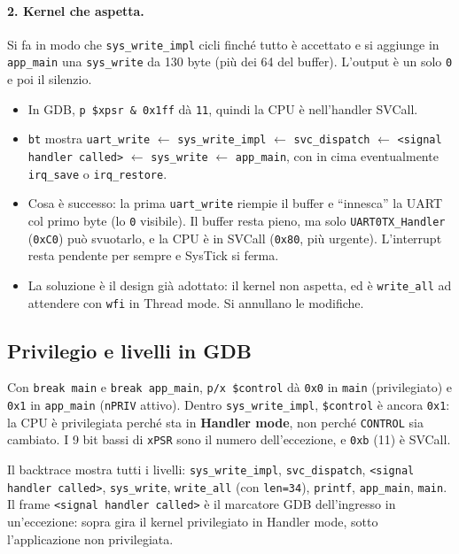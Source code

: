 \paragraph*{2. Kernel che aspetta.} Si fa in modo che \texttt{sys\_write\_impl} cicli finché tutto è accettato e si aggiunge in \texttt{app\_main} una \texttt{sys\_write} da 130 byte (più dei 64 del buffer). L'output è un solo \texttt{0} e poi il silenzio.
\begin{itemize}
    \item In GDB, \texttt{p \$xpsr \& 0x1ff} dà \texttt{11}, quindi la CPU è nell'handler SVCall.
    \item \texttt{bt} mostra \texttt{uart\_write} $\leftarrow$ \texttt{sys\_write\_impl} $\leftarrow$ \texttt{svc\_dispatch} $\leftarrow$ \texttt{<signal handler called>} $\leftarrow$ \texttt{sys\_write} $\leftarrow$ \texttt{app\_main}, con in cima eventualmente \texttt{irq\_save} o \texttt{irq\_restore}.
    \item Cosa è successo: la prima \texttt{uart\_write} riempie il buffer e ``innesca'' la UART col primo byte (lo \texttt{0} visibile). Il buffer resta pieno, ma solo \texttt{UART0TX\_Handler} (\texttt{0xC0}) può svuotarlo, e la CPU è in SVCall (\texttt{0x80}, più urgente). L'interrupt resta pendente per sempre e SysTick si ferma.
    \item La soluzione è il design già adottato: il kernel non aspetta, ed è \texttt{write\_all} ad attendere con \texttt{wfi} in Thread mode. Si annullano le modifiche.
\end{itemize}
 
\subsection*{Privilegio e livelli in GDB}
Con \texttt{break main} e \texttt{break app\_main}, \texttt{p/x \$control} dà \texttt{0x0} in \texttt{main} (privilegiato) e \texttt{0x1} in \texttt{app\_main} (\texttt{nPRIV} attivo). Dentro \texttt{sys\_write\_impl}, \texttt{\$control} è ancora \texttt{0x1}: la CPU è privilegiata perché sta in \textbf{Handler mode}, non perché \texttt{CONTROL} sia cambiato. I 9 bit bassi di \texttt{xPSR} sono il numero dell'eccezione, e \texttt{0xb} (11) è SVCall.
 
Il backtrace mostra tutti i livelli: \texttt{sys\_write\_impl}, \texttt{svc\_dispatch}, \texttt{<signal handler called>}, \texttt{sys\_write}, \texttt{write\_all} (con \texttt{len=34}), \texttt{printf}, \texttt{app\_main}, \texttt{main}. Il frame \texttt{<signal handler called>} è il marcatore GDB dell'ingresso in un'eccezione: sopra gira il kernel privilegiato in Handler mode, sotto l'applicazione non privilegiata.

